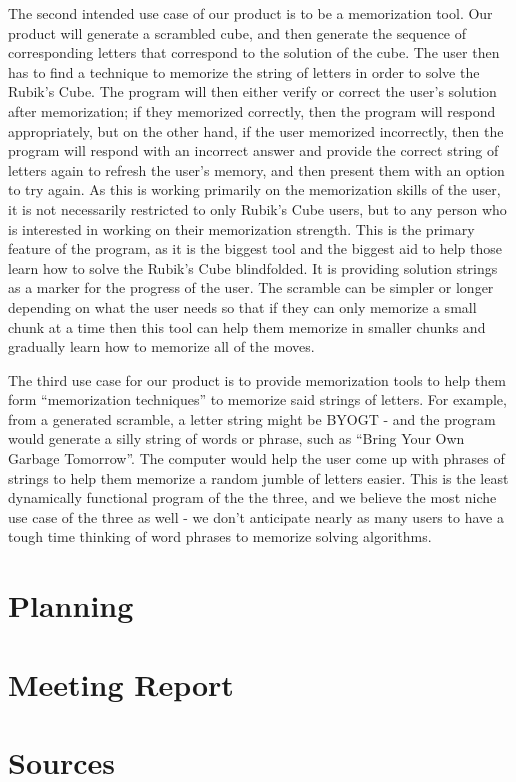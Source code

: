 \documentclass[12pt]{article}
\begin{document}
\par
The second intended use case of our product is to be a memorization tool. Our product will generate a scrambled cube, and then generate the sequence of corresponding letters that correspond to the solution of the cube. The user then has to find a technique to memorize the string of letters in order to solve the Rubik’s Cube. The program will then either verify or correct the user’s solution after memorization; if they memorized correctly, then the program will respond appropriately, but on the other hand, if the user memorized incorrectly, then the program will respond with an incorrect answer and provide the correct string of letters again to refresh the user’s memory, and then present them with an option to try again. As this is working primarily on the memorization skills of the user, it is not necessarily restricted to only Rubik’s Cube users, but to any person who is interested in working on their memorization strength. This is the primary feature of the program, as it is the biggest tool and the biggest aid to help those learn how to solve the Rubik’s Cube blindfolded. It is providing solution strings as a marker for the progress of the user. The scramble can be simpler or longer depending on what the user needs so that if they can only memorize a small chunk at a time then this tool can help them memorize in smaller chunks and gradually learn how to memorize all of the moves.

\par
The third use case for our product is to provide memorization tools to help them form “memorization techniques” to memorize said strings of letters. For example, from a generated scramble, a letter string might be BYOGT - and the program would generate a silly string of words or phrase, such as “Bring Your Own Garbage Tomorrow”. The computer would help the user come up with phrases of strings to help them memorize a random jumble of letters easier. This is the least dynamically functional program of the the three, and we believe the most niche use case of the three as well - we don’t anticipate nearly as many users to have a tough time thinking of word phrases to memorize solving algorithms.





\section{Planning}


\section{Meeting Report}


\section{Sources}
\end{document}

